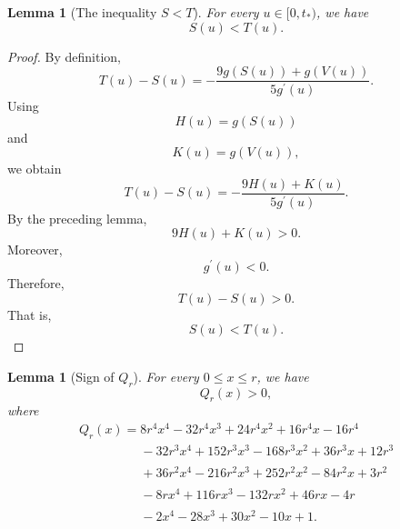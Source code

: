 \documentclass[11pt,a4paper]{article}
\numberwithin{equation}{section}
\numberwithin{table}{section}
\theoremstyle{plain}
\newtheorem{lemma}[theorem]{Lemma}
\theoremstyle{definition}\newtheorem{definition}[theorem]{Definition}
\theoremstyle{remark}\newtheorem{remark}[theorem]{Remark}
\begin{document}
\begin{lemma}[The inequality $S<T$]\label{supp:s2lemma7}
For every $u\in[0,t_*)$, we have 
\begin{equation*}
S(u)<T(u).
\end{equation*}
\end{lemma}

\begin{proof}
By definition, 
\begin{equation*}
T(u)-S(u)=-\frac{9g(S(u))+g(V(u))}{5g^{\prime}(u)}.
\end{equation*}
Using 
\begin{equation*}
H(u)=g(S(u))
\end{equation*}
and 
\begin{equation*}
K(u)=g(V(u)),
\end{equation*}
we obtain 
\begin{equation*}
T(u)-S(u)=-\frac{9H(u)+K(u)}{5g^{\prime}(u)}.
\end{equation*}
By the preceding lemma, 
\begin{equation*}
9H(u)+K(u)>0.
\end{equation*}
Moreover, 
\begin{equation*}
g^{\prime}(u)<0.
\end{equation*}
Therefore, 
\begin{equation*}
T(u)-S(u)>0.
\end{equation*}
That is, 
\begin{equation*}
S(u)<T(u).
\end{equation*}
\end{proof}

\begin{lemma}[Sign of $Q_r$]\label{supp:s2lemma8}
For every $0\leq x\leq r$, we have 
\begin{equation*}
Q_r(x)>0,
\end{equation*}
where 
\begin{equation*}
\begin{array}{l}
Q_r(x)=8r^4x^4-32r^4x^3+24r^4x^2+16r^4x-16r^4 \\ 
\phantom{Q_r(x)=}{}-32r^3x^4+152r^3x^3-168r^3x^2+36r^3x+12r^3 \\ 
\phantom{Q_r(x)=}{}+36r^2x^4-216r^2x^3+252r^2x^2-84r^2x+3r^2 \\ 
\phantom{Q_r(x)=}{}-8rx^4+116rx^3-132rx^2+46rx-4r \\ 
\phantom{Q_r(x)=}{}-2x^4-28x^3+30x^2-10x+1.%
\end{array}%
\end{equation*}
\end{lemma}
\end{document}
